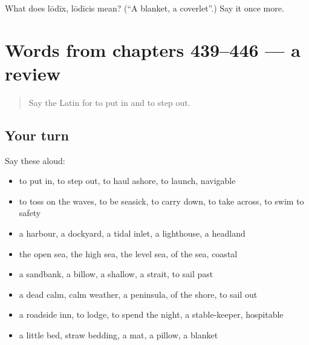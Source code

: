 \begin{tcolorbox}[breakable,colback=teal!4,colframe=teal!35!black,title={Before you move on}]
What does lōdīx, lōdīcis mean? (\textquotedblleft{}A blanket, a coverlet\textquotedblright{}.) Say it once more.
\end{tcolorbox}
\section[(dialogue)]{Words from chapters 439–446 — a review}

\label{lesson:LA-R446-review-439-446}



\begin{quote}
Say the Latin for to put in and to step out.
\end{quote}

\subsection*{Your turn}
Say these aloud:

\begin{itemize}
\raggedright
  \item to put in, to step out, to haul ashore, to launch, navigable
  \item to toss on the waves, to be seasick, to carry down, to take across, to swim to safety
  \item a harbour, a dockyard, a tidal inlet, a lighthouse, a headland
  \item the open sea, the high sea, the level sea, of the sea, coastal
  \item a sandbank, a billow, a shallow, a strait, to sail past
  \item a dead calm, calm weather, a peninsula, of the shore, to sail out
  \item a roadside inn, to lodge, to spend the night, a stable-keeper, hospitable
  \item a little bed, straw bedding, a mat, a pillow, a blanket
\end{itemize}

